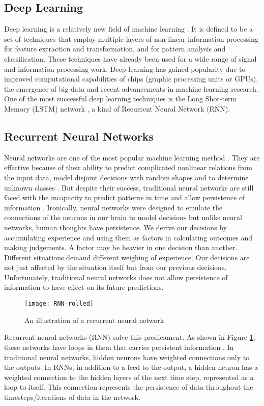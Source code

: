 \subsection{Deep Learning}
    Deep learning is a relatively new field of machine learning \cite{deng2014deep}. It is defined to be a set of techniques that employ multiple layers of non-linear information processing for feature extraction and transformation, and for pattern analysis and classification. These techniques have already been used for a wide range of signal and information processing work. Deep learning has gained popularity due to improved computational capabilities of chips (graphic processing units or GPUs), the emergence of big data and recent advancements in machine learning research. One of the most successful deep learning techniques is the Long Shot-term Memory (LSTM) network \cite{schmidhuber2015deep}, a kind of Recurrent Neural Network (RNN).

\subsection{Recurrent Neural Networks}
    Neural networks are one of the most popular machine learning method \cite{razi2005comparative}. They are effective because of their ability to predict complicated nonlinear relations from the input data, model disjoint decisions with random shapes and to determine unknown classes \cite{huang2006real}. But despite their success, traditional neural networks are still faced with the incapacity to predict patterns in time and allow persistence of information \cite{patan2008artificial}. Ironically, neural networks were designed to emulate the connections of the neurons in our brain to model decisions but unlike neural networks, human thoughts have persistence. We derive our decisions by accumulating experience and using them as factors in calculating outcomes and making judgements. A factor may be heavier in one decision than another. Different situations demand different weighing of experience. Our decisions are not just affected by the situation itself but from our previous decisions. Unfortunately, traditional neural networks does not allow persistence of information to have effect on its future predictions.

    \begin{figure}[H]
    \centering
    \texttt{[image: RNN-rolled]}
    \caption{An illustration of a recurrent neural network \cite{olah2015understanding}}
    \label{fig:rnn-rolled}
    \end{figure}
    Recurrent neural networks (RNN) solve this predicament. As shown in Figure \ref{fig:rnn-rolled}, these networks have loops in them that carries persistent information \cite{mikolov2010recurrent}. In traditional neural networks, hidden neurons have weighted connections only to the outputs. In RNNs, in addition to a feed to the output, a hidden neuron has a weighted connection to the hidden layers of the next time step, represented as a loop to itself. This connection represents the persistence of data throughout the timesteps/iterations of data in the network.

